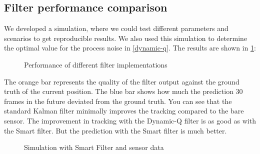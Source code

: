 \documentclass[titlepage, a4paper, 11pt]{scrartcl}
\begin{document}
\subsection{Filter performance comparison} \label{perf-comp}

We developed a simulation, where we could test different parameters and scenarios to get reproducible results. 
We also used this simulation to determine the optimal value for the process noise in \cref{dynamic-q}. The results are shown in \cref{fig:sim-results}:

\begin{figure}[H]
    \centering
    \caption{Performance of different filter implementations}
    \label{fig:sim-results}
\end{figure}

The orange bar represents the quality of the filter output against the ground truth of the current position. 
The blue bar shows how much the prediction 30 frames in the future deviated from the ground truth.
You can see that the standard Kalman filter minimally improves the tracking compared to the bare sensor.
The improvement in tracking with the Dynamic-Q filter is as good as with the Smart filter.
But the prediction with the Smart filter is much better.

\begin{figure}[H]
    \centering
    \caption{Simulation with Smart Filter and sensor data}
    \label{fig:smart-vs-sensor}
\end{figure}
\end{document}
